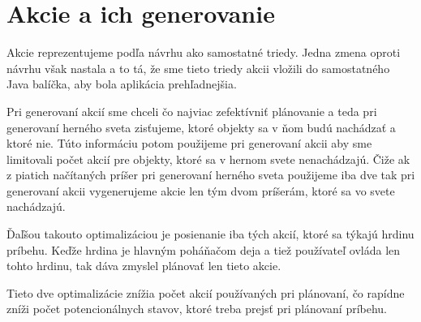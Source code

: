 \section{Akcie a ich generovanie}
Akcie reprezentujeme podľa návrhu ako samostatné triedy. Jedna zmena oproti návrhu však nastala a to tá, že sme tieto triedy akcii vložili do samostatného Java balíčka, aby bola aplikácia prehľadnejšia.\par
Pri generovaní akcií sme chceli čo najviac zefektívniť plánovanie a teda pri generovaní herného sveta zisťujeme, ktoré objekty sa v ňom budú nachádzať a ktoré nie. Túto informáciu potom použijeme pri generovaní akcii aby sme limitovali počet akcií pre objekty, ktoré sa v hernom svete nenachádzajú. Čiže ak z piatich načítaných príšer pri generovaní herného sveta použijeme iba dve tak pri generovaní akcii vygenerujeme akcie len tým dvom príšerám, ktoré sa vo svete nachádzajú.\par
Ďaľšou takouto optimalizáciou je posienanie iba tých akcií, ktoré sa týkajú hrdinu príbehu. Keďže hrdina je hlavným poháňačom deja a tiež používateľ ovláda len tohto hrdinu, tak dáva zmyslel plánovať len tieto akcie.\par
Tieto dve optimalizácie znížia počet akcií používaných pri plánovaní, čo rapídne zníži počet potencionálnych stavov, ktoré treba prejsť pri plánovaní príbehu.
